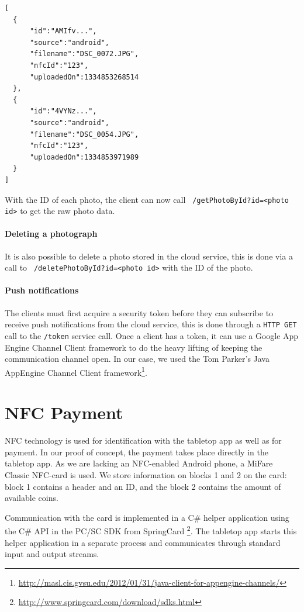 \documentclass{ubicomp2011}
\begin{document}
\begin{lstlisting}
[
  {
	  "id":"AMIfv...",
	  "source":"android",
	  "filename":"DSC_0072.JPG",
	  "nfcId":"123",
	  "uploadedOn":1334853268514
  },
  {
	  "id":"4VYNz...",
	  "source":"android",
	  "filename":"DSC_0054.JPG",
	  "nfcId":"123",
	  "uploadedOn":1334853971989
  }
]
\end{lstlisting}

With the ID of each photo, the client can now call \lstinline{ /getPhotoById?id=<photo id>} to get the raw photo data.

\paragraph{Deleting a photograph}
It is also possible to delete a photo stored in the cloud service, this is done via a call to \lstinline{ /deletePhotoById?id=<photo id>} with the ID of the photo.

\paragraph{Push notifications}
The clients must first acquire a security token before they can subscribe to receive push notifications from the cloud service, this is done through a \lstinline{HTTP GET} call to the \lstinline{/token} service call. Once a client has a token, it can use a Google App Engine Channel Client framework to do the heavy lifting of keeping the communication channel open. In our case, we used the Tom Parker’s Java AppEngine Channel Client framework\footnote{\url{http://masl.cis.gvsu.edu/2012/01/31/java-client-for-appengine-channels/}}.

\section{NFC Payment}
NFC technology is used for identification with the tabletop app as well as for payment. In our proof of concept, the payment takes place directly in the tabletop app. As we are lacking an NFC-enabled Android phone, a MiFare Classic NFC-card is used. We store information on blocks 1 and 2 on the card: block 1 contains a header and an ID, and the block 2 contains the amount of available coins.

Communication with the card is implemented in a C\# helper application using the C\# API in the PC/SC SDK from SpringCard \footnote{\url{http://www.springcard.com/download/sdks.html}}. The tabletop app starts this helper application in a separate process and communicates through standard input and output streams.
\end{document}
